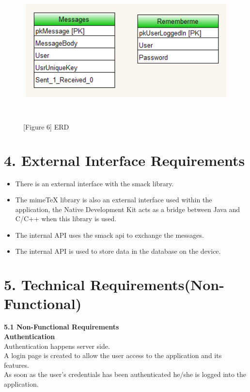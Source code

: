 \documentclass[29pt,a4paper]{moderncv}
\begin{document}
	\begin{figure}
		\centering
		\\ \includegraphics[width=4.5in, height=2.0in]{./erd.png}
		\\\caption{[Figure 6] ERD}\\
	\end{figure}
	
\newpage	
	\section*{\textbf{4. External Interface Requirements}}
	\vspace{4mm}
		\begin{itemize}
			\item There is an external interface with the smack library.
			\item The mimeTeX library is also an external interface used within the application, the Native Development Kit acts as a bridge between Java and C/C++ when this library is used.
			\item The internal API uses the smack api to exchange the messages.
			\item The internal API is used to store data in the database on the device.
		\end{itemize}

\newpage	
		\section*{\textbf{5. Technical Requirements(Non-Functional)}}
		\vspace{4mm}
		\noindent \textbf{5.1 Non-Functional Requirements}\\
		
		\noindent \textbf{Authentication}\\
			Authentication happens server side. \\
			A login page is created to allow the user access to the application and its features. \\
			As soon as the user’s credentials has been authenticated he/she is logged into the application.\\
			
\end{document}
